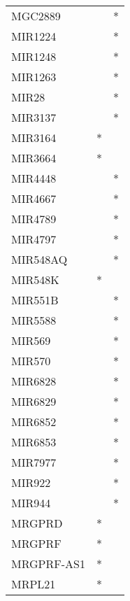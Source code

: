 \begin{longtable}{lcc}
MGC2889          &                &          * \\
MIR1224          &                &          * \\
MIR1248          &                &          * \\
MIR1263          &                &          * \\
MIR28            &                &          * \\
MIR3137          &                &          * \\
MIR3164          &              * &            \\
MIR3664          &              * &            \\
MIR4448          &                &          * \\
MIR4667          &                &          * \\
MIR4789          &                &          * \\
MIR4797          &                &          * \\
MIR548AQ         &                &          * \\
MIR548K          &              * &            \\
MIR551B          &                &          * \\
MIR5588          &                &          * \\
MIR569           &                &          * \\
MIR570           &                &          * \\
MIR6828          &                &          * \\
MIR6829          &                &          * \\
MIR6852          &                &          * \\
MIR6853          &                &          * \\
MIR7977          &                &          * \\
MIR922           &                &          * \\
MIR944           &                &          * \\
MRGPRD           &              * &            \\
MRGPRF           &              * &            \\
MRGPRF-AS1       &              * &            \\
MRPL21           &              * &            \\

\end{longtable}
